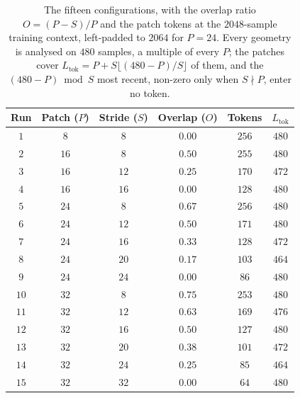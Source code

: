 \begin{table}[!tb]
    \centering
\small
    \begin{tabular}{@{}cccccc@{}}
        \toprule
        \textbf{Run} & \textbf{Patch ($P$)} & \textbf{Stride ($S$)} & \textbf{Overlap ($O$)} & \textbf{Tokens} & $L_{\mathrm{tok}}$ \\
        \midrule
        $1$ & $8$ & $8$ & $0.00$ & $256$ & $480$ \\
        \midrule
        $2$ & $16$ & $8$ & $0.50$ & $255$ & $480$ \\
        $3$ & $16$ & $12$ & $0.25$ & $170$ & $472$ \\
        $4$ & $16$ & $16$ & $0.00$ & $128$ & $480$ \\
        \midrule
        $5$ & $24$ & $8$ & $0.67$ & $256$ & $480$ \\
        $6$ & $24$ & $12$ & $0.50$ & $171$ & $480$ \\
        $7$ & $24$ & $16$ & $0.33$ & $128$ & $472$ \\
        $8$ & $24$ & $20$ & $0.17$ & $103$ & $464$ \\
        $9$ & $24$ & $24$ & $0.00$ & $86$ & $480$ \\
        \midrule
        $10$ & $32$ & $8$ & $0.75$ & $253$ & $480$ \\
        $11$ & $32$ & $12$ & $0.63$ & $169$ & $476$ \\
        $12$ & $32$ & $16$ & $0.50$ & $127$ & $480$ \\
        $13$ & $32$ & $20$ & $0.38$ & $101$ & $472$ \\
        $14$ & $32$ & $24$ & $0.25$ & $85$ & $464$ \\
        $15$ & $32$ & $32$ & $0.00$ & $64$ & $480$ \\
        \bottomrule
    \end{tabular}
\caption{The fifteen configurations, with the overlap ratio $O=(P-S)/P$ and the patch tokens at the $2048$-sample training context, left-padded to $2064$ for $P=24$. Every geometry is analysed on $480$ samples, a multiple of every $P$; the patches cover $L_{\mathrm{tok}}=P+S\lfloor(480-P)/S\rfloor$ of them, and the $(480-P)\bmod S$ most recent, non-zero only when $S\nmid P$, enter no token.}%
    \label{tab:hfModels}
\end{table}
